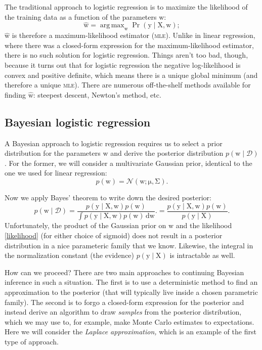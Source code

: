 \documentclass{article}
\newcommand{\acro}[1]{\textsc{\MakeLowercase{#1}}}
\newcommand{\given}{\mid}
\newcommand{\mc}[1]{\mathcal{#1}}
\newcommand{\data}{\mc{D}}
\newcommand{\intd}[1]{\,\mathrm{d}{#1}}
\newcommand{\mat}[1]{\bm{\mathrm{#1}}}
\renewcommand{\vec}[1]{\bm{\mathrm{#1}}}
\DeclareMathOperator*{\argmax}{arg\,max}
\begin{document}
The traditional approach to logistic regression is to maximize the
likelihood of the training data as a function of the parameters
$\vec{w}$:
\begin{equation*}
  \hat{\vec{w}}
  =
  \argmax_{\vec{w}}
  \Pr(\vec{y} \given \mat{X}, \vec{w});
\end{equation*}
$\hat{\vec{w}}$ is therefore a maximum-likelihood estimator
(\acro{MLE}).  Unlike in linear regression, where there was a
closed-form expression for the maximum-likelihood estimator, there is
no such solution for logistic regression.  Things aren't too bad,
though, because it turns out that for logistic regression the negative
log-likelihood is convex and positive definite, which means there is a
unique global minimum (and therefore a unique \acro{MLE}).  There are
numerous off-the-shelf methods available for finding $\hat{\vec{w}}$:
steepest descent, Newton's method, etc.

\subsection*{Bayesian logistic regression}

A Bayesian approach to logistic regression requires us to select a
prior distribution for the parameters $\vec{w}$ and derive the
posterior distribution $p(\vec{w} \given \data)$.  For the former, we
will consider a multivariate Gaussian prior, identical to the one we used
for linear regression:
\begin{equation*}
  p(\vec{w})
  =
  \mc{N}(\vec{w}; \vec{\mu}, \mat{\Sigma}).
\end{equation*}

Now we apply Bayes' theorem to write down the desired posterior:
\begin{equation*}
  p(\vec{w} \given \data)
  =
  \frac{p(\vec{y} \given \mat{X}, \vec{w}) p(\vec{w})}
       {\int p(\vec{y} \given \mat{X}, \vec{w}) p(\vec{w}) \intd{\vec{w}}}.
  =
  \frac{p(\vec{y} \given \mat{X}, \vec{w}) p(\vec{w})}
       {p(\vec{y} \given \mat{X})}.
\end{equation*}
Unfortunately, the product of the Gaussian prior on $\vec{w}$ and the
likelihood \eqref{likelihood} (for either choice of sigmoid) does not
result in a posterior distribution in a nice parameteric family that
we know.  Likewise, the integral in the normalization constant (the
evidence) $p(\vec{y} \given \mat{X})$ is intractable as well.

How can we proceed?  There are two main approaches to continuing
Bayesian inference in such a situation.  The first is to use a
deterministic method to find an approximation to the posterior (that
will typically live inside a chosen parametric family).  The second is
to forgo a closed-form expression for the posterior and instead derive
an algorithm to draw \emph{samples} from the posterior distribution,
which we may use to, for example, make Monte Carlo estimates to
expectations.  Here we will consider the \emph{Laplace approximation,}
which is an example of the first type of approach.
\end{document}
